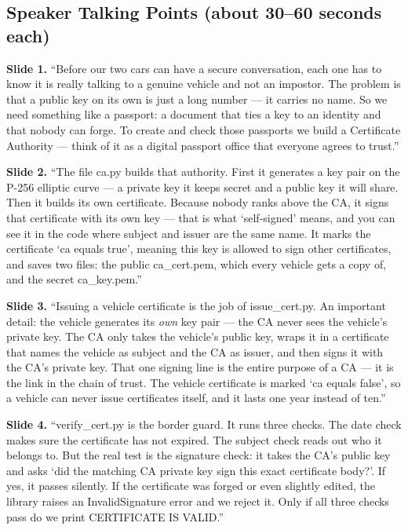 \documentclass[11pt,a4paper]{report}
\begin{document}
\subsection{Speaker Talking Points (about 30--60 seconds each)}

\textbf{Slide 1.} ``Before our two cars can have a secure conversation, each one
has to know it is really talking to a genuine vehicle and not an impostor. The
problem is that a public key on its own is just a long number --- it carries no
name. So we need something like a passport: a document that ties a key to an
identity and that nobody can forge. To create and check those passports we build
a Certificate Authority --- think of it as a digital passport office that
everyone agrees to trust.''

\textbf{Slide 2.} ``The file ca.py builds that authority. First it generates a
key pair on the P-256 elliptic curve --- a private key it keeps secret and a
public key it will share. Then it builds its own certificate. Because nobody
ranks above the CA, it signs that certificate with its own key --- that is what
`self-signed' means, and you can see it in the code where subject and issuer are
the same name. It marks the certificate `ca equals true', meaning this key is
allowed to sign other certificates, and saves two files: the public ca\_cert.pem,
which every vehicle gets a copy of, and the secret ca\_key.pem.''

\textbf{Slide 3.} ``Issuing a vehicle certificate is the job of issue\_cert.py.
An important detail: the vehicle generates its \emph{own} key pair --- the CA
never sees the vehicle's private key. The CA only takes the vehicle's public key,
wraps it in a certificate that names the vehicle as subject and the CA as issuer,
and then signs it with the CA's private key. That one signing line is the entire
purpose of a CA --- it is the link in the chain of trust. The vehicle certificate
is marked `ca equals false', so a vehicle can never issue certificates itself,
and it lasts one year instead of ten.''

\textbf{Slide 4.} ``verify\_cert.py is the border guard. It runs three checks.
The date check makes sure the certificate has not expired. The subject check
reads out who it belongs to. But the real test is the signature check: it takes
the CA's public key and asks `did the matching CA private key sign this exact
certificate body?'. If yes, it passes silently. If the certificate was forged or
even slightly edited, the library raises an InvalidSignature error and we reject
it. Only if all three checks pass do we print CERTIFICATE IS VALID.''
\end{document}
